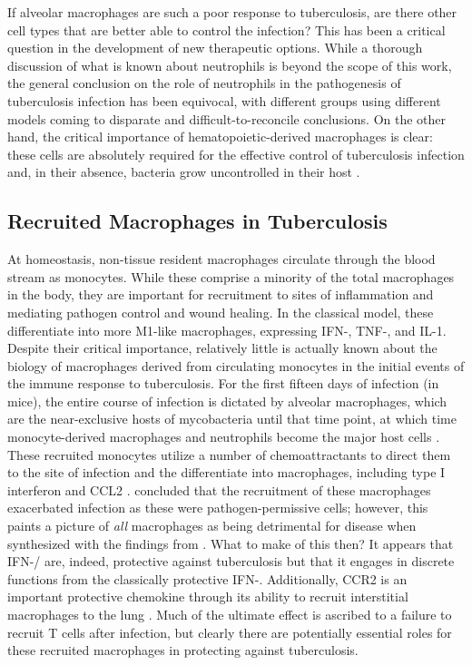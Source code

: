 If alveolar macrophages are such a poor response to tuberculosis, are there other cell types that are better able to control the infection? This has been a critical question in the development of new therapeutic options. While a thorough discussion of what is known about neutrophils is beyond the scope of this work, the general conclusion on the role of neutrophils in the pathogenesis of tuberculosis infection has been equivocal, with different groups using different models coming to disparate and difficult-to-reconcile conclusions. On the other hand, the critical importance of hematopoietic-derived macrophages is clear: these cells are absolutely required for the effective control of tuberculosis infection and, in their absence, bacteria grow uncontrolled in their host \citep{Pagan2015, Matty2019, Clay2007}. 

\subsection{Recruited Macrophages in Tuberculosis}\label{recmac}

At homeostasis, non-tissue resident macrophages circulate through the blood stream as monocytes. While these comprise a minority of the total macrophages in the body, they are important for recruitment to sites of inflammation and mediating pathogen control and wound healing. In the classical model, these differentiate into more M1-like macrophages, expressing IFN-\textgamma, TNF-\textalpha, and IL-1\textbeta. Despite their critical importance, relatively little is actually known about the biology of macrophages derived from circulating monocytes in the initial events of the immune response to tuberculosis. For the first fifteen days of infection (in mice), the entire course of infection is dictated by alveolar macrophages, which are the near-exclusive hosts of mycobacteria until that time point, at which time monocyte-derived macrophages and neutrophils become the major host cells \citep{Cohen2018}. These recruited monocytes utilize a number of chemoattractants to direct them to the site of infection and the differentiate into macrophages, including type I interferon and CCL2 \citep{Antonelli2010, Desvignes2012, Peters2001, Peters2004}. \citeauthor{Antonelli2010} concluded that the recruitment of these macrophages exacerbated infection as these were pathogen-permissive cells; however, this paints a picture of \textit{all} macrophages as being detrimental for disease when synthesized with the findings from \citeauthor{Leemans2001}. What to make of this then? It appears that IFN-\textalpha/\textbeta{} are, indeed, protective against tuberculosis but that it engages in discrete functions from the classically protective IFN-\textgamma. Additionally, CCR2 is an important protective chemokine through its ability to recruit interstitial macrophages to the lung \citep{Peters2001}. Much of the ultimate effect is ascribed to a failure to recruit T cells after infection, but clearly there are potentially essential roles for these recruited macrophages in protecting against tuberculosis. 

